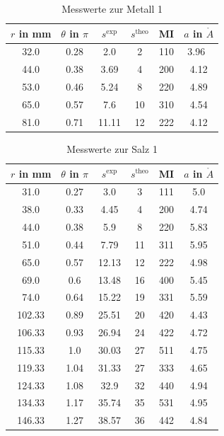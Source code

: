\begin{table}[H]
 \begin{tabular}{cccccc}
$r$ in mm&	$\theta$ in $\pi$& $s^\text{exp}$& $s^\text{theo}$ & MI &$a$ in $\mathring{A}$\\
\hline
32.0& 0.28&		2.0&		2&		110&		3.96\ \\
44.0&		0.38&		3.69&		4&		200&		4.12\\
53.0&		0.46&		5.24&		8&		220&		4.89\\ 
65.0&		0.57&		7.6&		10&		310&		4.54\\ 
81.0&		0.71&		11.11&		12&		222&		4.12\\ 
  
 \end{tabular}
 \caption{Messwerte zur Metall 1}
 \label{tab:messreihe1}

\end{table}

\begin{table}[H]
 \begin{tabular}{cccccc}
$r$ in mm&	$\theta$ in $\pi$& $s^\text{exp}$& $s^\text{theo}$ & MI &$a$ in $\mathring{A}$\\
\hline
31.0&		0.27&		3.0&		3&		111&		5.0\\
38.0&		0.33&		4.45&		4&		200&		4.74\\
44.0&		0.38&		5.9&		8&		220&		5.83\\
51.0&		0.44&		7.79&		11&		311&		5.95\\
65.0&		0.57&		12.13&		12&		222&		4.98\\
69.0&		0.6&		13.48&		16&		400&		5.45\\
74.0&		0.64&		15.22&		19&		331&		5.59\\
102.33&		0.89&		25.51&		20&		420&		4.43\\
106.33&		0.93&		26.94&		24&		422&		4.72\\
115.33&		1.0&		30.03&		27&		511&		4.75\\
119.33&		1.04&		31.33&		27&		333&		4.65\\
124.33&		1.08&		32.9&		32&		440&		4.94\\
134.33&		1.17&		35.74&		35&		531&		4.95\\
146.33&		1.27&		38.57&		36&		442&		4.84\\
 \end{tabular}
 \caption{Messwerte zur Salz 1}
 \label{tab:messreihe2}

\end{table}

